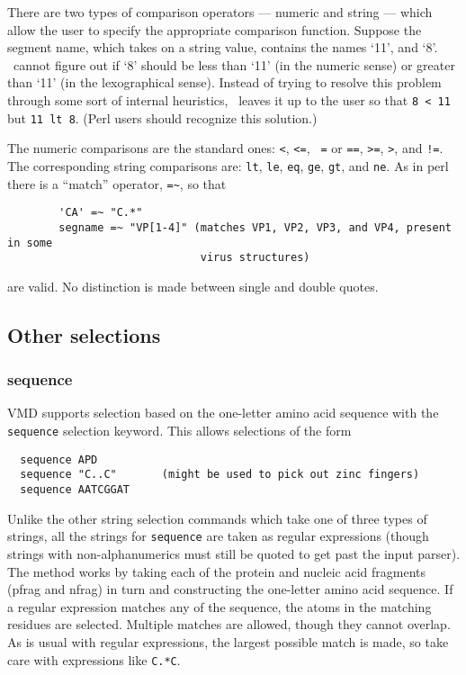 There are two types of comparison operators --- numeric and string ---
which allow the user to specify the appropriate comparison function.
Suppose the segment name, which takes on a string value, contains the
names `11', and `8'.  \VMD\ cannot figure out if `8' should be less
than `11' (in the numeric sense) or greater than `11' (in the
lexographical sense).  Instead of trying to resolve this problem
through some sort of internal heuristics, \VMD\ leaves it up to the
user so that {\tt 8 < 11} but {\tt 11 lt 8}.  (Perl users should
recognize this solution.)

The numeric comparisons are the standard ones: {\tt <}, {\tt <=}, {\tt
=} or {\tt ==}, {\tt >=}, {\tt >}, and {\tt !=}.  The corresponding
string comparisons are: {\tt lt}, {\tt le}, {\tt eq}, {\tt ge}, {\tt gt}, 
and {\tt ne}.  As in perl there
is a ``match'' operator, \verb!=~!, so that

\begin{verbatim}
        'CA' =~ "C.*"
        segname =~ "VP[1-4]" (matches VP1, VP2, VP3, and VP4, present in some
                              virus structures)
\end{verbatim}

\noindent are valid.  No distinction is made between single and double quotes.

\subsection{Other selections}
\subsubsection{sequence}
  VMD supports selection based on the one-letter amino acid
sequence with the \verb!sequence! selection keyword.  This allows
selections of the form
\begin{verbatim}
  sequence APD
  sequence "C..C"       (might be used to pick out zinc fingers)
  sequence AATCGGAT
\end{verbatim}

Unlike the other string selection commands which take one of three
types of strings, all the strings for \verb!sequence! are taken as
regular expressions (though strings with non-alphanumerics must still
be quoted to get past the input parser).  The method works by taking
each of the protein and nucleic acid fragments (pfrag and nfrag) 
in turn and constructing the one-letter
amino acid sequence.  If a regular expression matches any of the
sequence, the atoms in the matching residues are selected.  Multiple
matches are allowed, though they cannot overlap.  As is usual with
regular expressions, the largest possible match is made, so take care
with expressions like
\verb!C.*C!.

